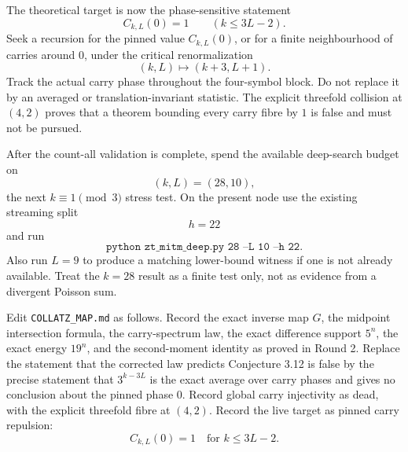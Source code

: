 \documentclass[11pt]{article}
\theoremstyle{remark}
\begin{document}
The theoretical target is now the phase-sensitive statement
\[
C_{k,L}(0)=1
\qquad
(k\le3L-2).
\]
Seek a recursion for the pinned value \(C_{k,L}(0)\), or for a finite neighbourhood of carries around \(0\), under the critical renormalization
\[
(k,L)\longmapsto(k+3,L+1).
\]
Track the actual carry phase throughout the four-symbol block.  Do not replace it by an averaged or translation-invariant statistic.  The explicit threefold collision at \((4,2)\) proves that a theorem bounding every carry fibre by \(1\) is false and must not be pursued.

After the count-all validation is complete, spend the available deep-search budget on
\[
(k,L)=(28,10),
\]
the next \(k\equiv1\pmod3\) stress test.  On the present node use the existing streaming split
\[
h=22
\]
and run
\[
\texttt{python zt\_mitm\_deep.py 28 --L 10 --h 22}.
\]
Also run \(L=9\) to produce a matching lower-bound witness if one is not already available.  Treat the \(k=28\) result as a finite test only, not as evidence from a divergent Poisson sum.

Edit \texttt{COLLATZ\_MAP.md} as follows.  Record the exact inverse map \(G\), the midpoint intersection formula, the carry-spectrum law, the exact difference support \(5^n\), the exact energy \(19^n\), and the second-moment identity as proved in Round 2.  Replace the statement that the corrected law predicts Conjecture 3.12 is false by the precise statement that \(3^{k-3L}\) is the exact average over carry phases and gives no conclusion about the pinned phase \(0\).  Record global carry injectivity as dead, with the explicit threefold fibre at \((4,2)\).  Record the live target as pinned carry repulsion:
\[
C_{k,L}(0)=1
\quad
\text{for }
k\le3L-2.
\]
\end{document}
